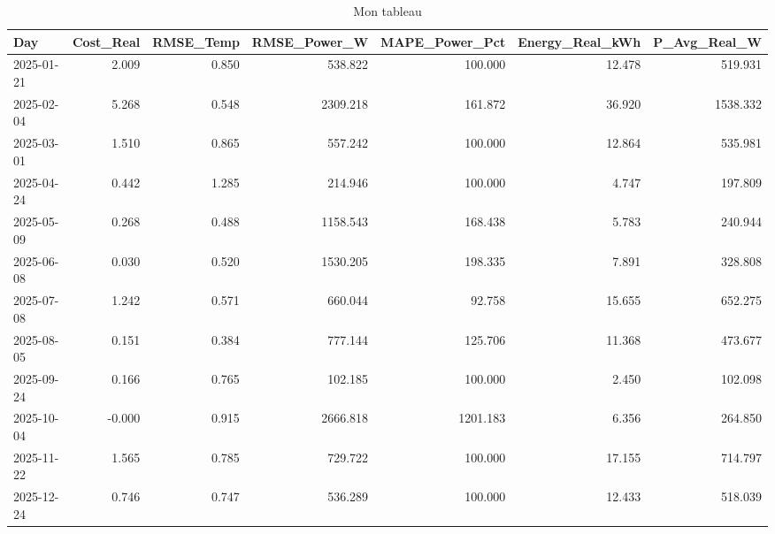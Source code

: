 \begin{table}
\caption{Mon tableau}
\label{tab:mon_tableau}
\begin{tabular}{lrrrrrr}
\toprule
Day & Cost_Real & RMSE_Temp & RMSE_Power_W & MAPE_Power_Pct & Energy_Real_kWh & P_Avg_Real_W \\
\midrule
2025-01-21 & 2.009 & 0.850 & 538.822 & 100.000 & 12.478 & 519.931 \\
2025-02-04 & 5.268 & 0.548 & 2309.218 & 161.872 & 36.920 & 1538.332 \\
2025-03-01 & 1.510 & 0.865 & 557.242 & 100.000 & 12.864 & 535.981 \\
2025-04-24 & 0.442 & 1.285 & 214.946 & 100.000 & 4.747 & 197.809 \\
2025-05-09 & 0.268 & 0.488 & 1158.543 & 168.438 & 5.783 & 240.944 \\
2025-06-08 & 0.030 & 0.520 & 1530.205 & 198.335 & 7.891 & 328.808 \\
2025-07-08 & 1.242 & 0.571 & 660.044 & 92.758 & 15.655 & 652.275 \\
2025-08-05 & 0.151 & 0.384 & 777.144 & 125.706 & 11.368 & 473.677 \\
2025-09-24 & 0.166 & 0.765 & 102.185 & 100.000 & 2.450 & 102.098 \\
2025-10-04 & -0.000 & 0.915 & 2666.818 & 1201.183 & 6.356 & 264.850 \\
2025-11-22 & 1.565 & 0.785 & 729.722 & 100.000 & 17.155 & 714.797 \\
2025-12-24 & 0.746 & 0.747 & 536.289 & 100.000 & 12.433 & 518.039 \\
\bottomrule
\end{tabular}
\end{table}
